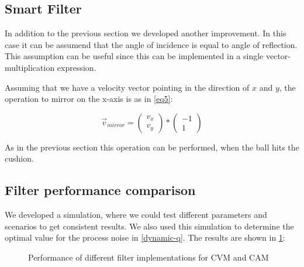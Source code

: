 \documentclass[notitlepage, a4paper, 11pt]{scrartcl}
\begin{document}
\begin{multicols}{2}
\subsection{Smart Filter} \label{smart-filter}

In addition to the previous section we developed another improvement. In this case it can be assumend that the angle of incidence is equal to angle of reflection. 
This assumption can be useful since this can be implemented in a single vector-multiplication expression. 

Assuming that we have a velocity vector pointing in the direction of $x$ and $y$, the operation to mirror on the x-axis is as in \cref{eq5}:

\begin{equation} 
    \label{eq5}
    \vec{v}_{mirror} = 
    \left(\!
    \begin{array}{c}
      v_x \\
      v_y
    \end{array}
    \!\right) *
    \left(\!
    \begin{array}{c}
        -1 \\
        1
    \end{array}
    \!\right)
\end{equation}

As in the previous section this operation can be performed, when the ball hits the cushion.


\subsection{Filter performance comparison} \label{perf-comp}

We developed a simulation, where we could test different parameters and scenarios to get consistent results. 
We also used this simulation to determine the optimal value for the process noise in \cref{dynamic-q}. The results are shown in \cref{fig:sim-results}:

\begin{figure}[H]
    \centering
    \caption{Performance of different filter implementations for CVM and CAM}
    \label{fig:sim-results}
\end{figure}


\end{multicols}
\end{document}
